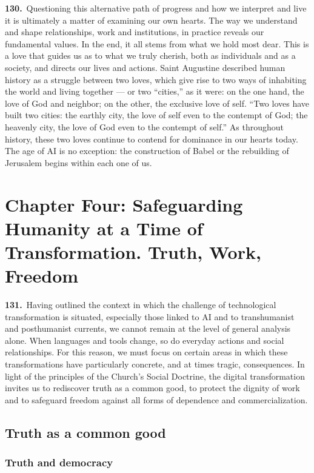 \documentclass{article}
\begin{document}
\textbf{130.}\ Questioning this alternative path of progress and how we interpret and live it is ultimately a matter of examining our own hearts. The way we understand and shape relationships, work and institutions, in practice reveals our fundamental values. In the end, it all stems from what we hold most dear. This is a love that guides us as to what we truly cherish, both as individuals and as a society, and directs our lives and actions. Saint Augustine described human history as a struggle between two loves, which give rise to two ways of inhabiting the world and living together --- or two ``cities,'' as it were: on the one hand, the love of God and neighbor; on the other, the exclusive love of self. ``Two loves have built two cities: the earthly city, the love of self even to the contempt of God; the heavenly city, the love of God even to the contempt of self.''\cite{n139} As throughout history, these two loves continue to contend for dominance in our hearts today. The age of AI is no exception: the construction of Babel or the rebuilding of Jerusalem begins within each one of us.

\section{Chapter Four: Safeguarding Humanity at a Time of Transformation. Truth, Work, Freedom}

\textbf{131.}\ Having outlined the context in which the challenge of technological transformation is situated, especially those linked to AI and to transhumanist and posthumanist currents, we cannot remain at the level of general analysis alone. When languages and tools change, so do everyday actions and social relationships. For this reason, we must focus on certain areas in which these transformations have particularly concrete, and at times tragic, consequences. In light of the principles of the Church's Social Doctrine, the digital transformation invites us to rediscover truth as a common good, to protect the dignity of work and to safeguard freedom against all forms of dependence and commercialization.

\subsection{Truth as a common good}

\subsubsection{Truth and democracy}
\end{document}

